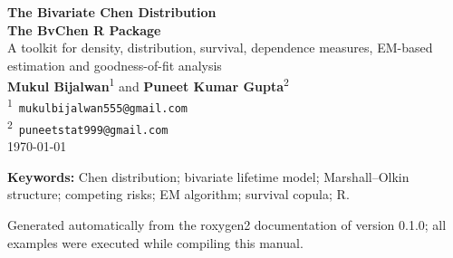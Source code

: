 \documentclass[11pt,a4paper]{article}
\providecommand{\proglang}[1]{\textsf{#1}}
\begin{document}
\begin{titlepage}
\centering
\vspace*{1.5cm}
{\Huge \bfseries The Bivariate Chen Distribution\\[0.6em]
The \textsf{BvChen} R Package\\[1.2em]}
{\Large A toolkit for density, distribution, survival, dependence
measures, EM-based estimation and goodness-of-fit analysis\\[2em]}
{\large
\textbf{Mukul Bijalwan}\textsuperscript{1} \quad and \quad
\textbf{Puneet Kumar Gupta}\textsuperscript{2}\\[1em]}
{\normalsize
\textsuperscript{1}\ \texttt{mukulbijalwan555@gmail.com}\quad
\href{https://orcid.org/0009-0001-3040-6912}{%
}\\
\textsuperscript{2}\ \texttt{puneetstat999@gmail.com}\\[2em]}
{\normalsize \today}
\vspace{1.5em}

\begin{minipage}{0.88\textwidth}
\begin{abstract}
\noindent
This manual documents the \textsf{BvChen} package, an \proglang{R}
implementation of the bivariate extension of the bathtub-shaped Chen
distribution proposed by Gupta, Pundir, Sharma and Mesfioui (2022,
\emph{Life Cycle Reliability and Safety Engineering} 11:247--259),
constructed from three independent latent Chen (2000) components
through competing risks. The package provides the joint density, distribution and
survival functions (including the singular component on the diagonal),
random variate generation, marginal and conditional distributions,
a Marshall--Olkin type survival copula with Kendall's $\tau$, joint
moments, maximum-likelihood estimation via the EM algorithm,
Kolmogorov--Smirnov goodness-of-fit tests and Q--Q diagnostics.
Complete univariate Chen building blocks are included. Every documented
function is illustrated with executable examples whose live output
appears directly beneath the code in this document.
\end{abstract}
\end{minipage}

\vspace{1em}
{\small \textbf{Keywords:} Chen distribution; bivariate lifetime
model; Marshall--Olkin structure; competing risks; EM algorithm;
survival copula; \proglang{R}.}

\vspace{1em}
{\footnotesize Generated automatically from the roxygen2 documentation
of version 0.1.0; all examples were executed while compiling this
manual.}
\vspace*{\fill}
\end{titlepage}
\end{document}
